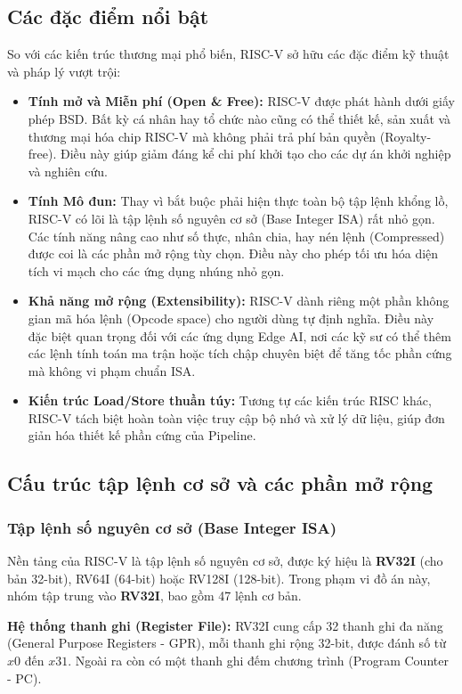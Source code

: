 \subsection{Các đặc điểm nổi bật}
So với các kiến trúc thương mại phổ biến, RISC-V sở hữu các đặc điểm kỹ 
thuật và pháp lý vượt trội:
\begin{itemize}
    \item \textbf{Tính mở và Miễn phí (Open \& Free):} RISC-V được phát hành dưới giấy phép BSD. Bất kỳ cá nhân hay tổ chức nào cũng có thể thiết kế, sản xuất và thương mại hóa chip RISC-V mà không phải trả phí bản quyền (Royalty-free). Điều này giúp giảm đáng kể chi phí khởi tạo cho các dự án khởi nghiệp và nghiên cứu.
    \item \textbf{Tính Mô đun:} Thay vì bắt buộc phải hiện thực toàn bộ tập lệnh khổng lồ, RISC-V có lõi là tập lệnh số nguyên cơ sở (Base Integer ISA) rất nhỏ gọn. Các tính năng nâng cao như số thực, nhân chia, hay nén lệnh (Compressed) được coi là các phần mở rộng tùy chọn. Điều này cho phép tối ưu hóa diện tích vi mạch cho các ứng dụng nhúng nhỏ gọn.
    \item \textbf{Khả năng mở rộng (Extensibility):} RISC-V dành riêng một phần không gian mã hóa lệnh (Opcode space) cho người dùng tự định nghĩa. Điều này đặc biệt quan trọng đối với các ứng dụng Edge AI, nơi các kỹ sư có thể thêm các lệnh tính toán ma trận hoặc tích chập chuyên biệt để tăng tốc phần cứng mà không vi phạm chuẩn ISA.
    \item \textbf{Kiến trúc Load/Store thuần túy:} Tương tự các kiến trúc RISC khác, RISC-V tách biệt hoàn toàn việc truy cập bộ nhớ và xử lý dữ liệu, giúp đơn giản hóa thiết kế phần cứng của Pipeline.
\end{itemize}

\subsection{Cấu trúc tập lệnh cơ sở và các phần mở rộng}

\subsubsection{Tập lệnh số nguyên cơ sở (Base Integer ISA)}
Nền tảng của RISC-V là tập lệnh số nguyên cơ sở, được ký hiệu là \textbf{RV32I} (cho bản 32-bit), RV64I (64-bit) hoặc RV128I (128-bit). Trong phạm vi đồ án này, nhóm tập trung vào \textbf{RV32I}, bao gồm 47 lệnh cơ bản.

\textbf{Hệ thống thanh ghi (Register File):}
RV32I cung cấp 32 thanh ghi đa năng (General Purpose Registers - GPR), mỗi thanh ghi rộng 32-bit, được đánh số từ $x0$ đến $x31$. Ngoài ra còn có một thanh ghi đếm chương trình (Program Counter - PC).

